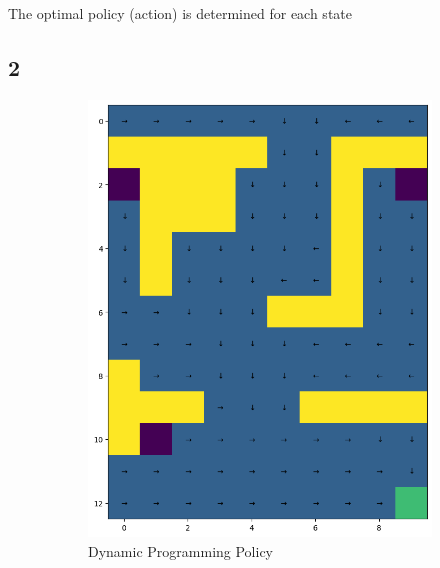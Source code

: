 \documentclass[12pt,a4paper]{report}
\begin{document}
The optimal policy (action) is determined for each state


\subsection*{2}
\begin{figure}[H]
    \centering
    \begin{subfigure}[b]{0.49\textwidth}
        \centering
        \includegraphics[width=\textwidth]{assets/dp/dp_optimal_policy.png}        
        \caption{Dynamic Programming Policy}
    \end{subfigure}
    \hfill 
    \begin{subfigure}[b]{0.49\textwidth}
        \centering

\end{subfigure}
\end{figure}
\end{document}
